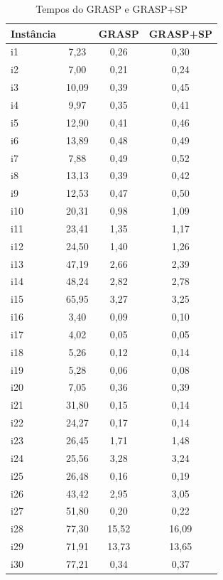 \documentclass[article]{rian_article}
\begin{document}
 \begin{table}[hbtp]
\caption{Tempos do GRASP e GRASP+SP}
\label{tab:tempo}
\centering
\footnotesize
\begin{tabular}{|l|c|c|c|}
\hline
Instância	  & \citep{zudio2018}	&GRASP    & GRASP+SP	   \\ \hline
i1	  & 7,23	&0,26	  & 0,30	  \\ \hline 
i2	  & 7,00	&0,21	  & 0,24	  \\ \hline 
i3	  & 10,09	&0,39	  & 0,45	  \\ \hline 
i4	  & 9,97	&0,35  	  & 0,41	  \\ \hline 
i5	  & 12,90	&0,41     & 0,46	  \\ \hline 
i6	  & 13,89	&0,48     & 0,49	  \\ \hline 
i7	  & 7,88	&0,49     & 0,52	  \\ \hline 
i8	  & 13,13	&0,39     & 0,42	  \\ \hline 
i9	  & 12,53	&0,47     & 0,50	  \\ \hline 
i10	  & 20,31	&0,98     & 1,09	  \\ \hline 
i11	  & 23,41	&1,35     & 1,17	  \\ \hline 
i12	  & 24,50	&1,40     & 1,26	  \\ \hline 
i13	  & 47,19	&2,66	  & 2,39	  \\ \hline 
i14	  & 48,24	&2,82	  & 2,78	  \\ \hline 
i15	  & 65,95	&3,27	  & 3,25	  \\ \hline
i16  	& 3,40		& 0,09	   & 0,10	  \\ \hline
i17  	& 4,02		& 0,05	   &  0,05	  \\ \hline
i18  	& 5,26		& 0,12	   &  0,14	  \\ \hline
i19  	& 5,28		& 0,06	   &  0,08	  \\ \hline
i20  	& 7,05		& 0,36	   &  0,39	  \\ \hline
i21  	& 31,80		& 0,15	   &  0,14	  \\ \hline
i22  	& 24,27		& 0,17	   &  0,14	  \\ \hline
i23  	& 26,45		& 1,71	   &  1,48	  \\ \hline
i24  	& 25,56		& 3,28	   &  3,24	  \\ \hline
i25  	& 26,48		& 0,16	   &  0,19	  \\ \hline
i26  	& 43,42		& 2,95	   &  3,05	  \\ \hline
i27  	& 51,80		& 0,20	   &  0,22        \\ \hline
i28  	& 77,30		& 15,52	   &  16,09	  \\ \hline
i29  	& 71,91		& 13,73	   &  13,65	  \\ \hline
i30  	& 77,21		& 0,34	   &  0,37	  \\ \hline
\end{tabular}
\end{table}
\end{document}
